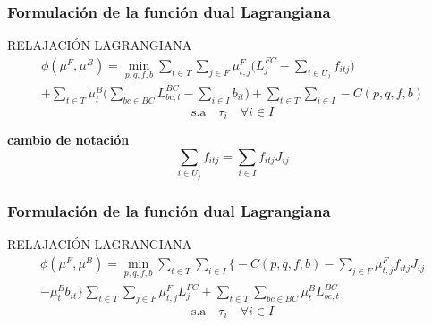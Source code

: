 \documentclass[xcolor=dvipsnames, utf8, spanish]{beamer} %
\begin{document}
\begin{frame}
	\frametitle{Formulación de la función dual Lagrangiana}
	\begingroup
		\begin{block} {RELAJACIÓN LAGRANGIANA}
			\begin{align}
				\phi(\mu^F,\mu^B)=\min_{p,q,f,b} \sum_{t \in T} \sum_{j \in F} \mu_{t,j}^F \Big( L_j^{FC}-\sum_{i \in U_j}f_{itj} \Big)   \nonumber \\	
				+ \sum_{t \in T} \mu_{t}^B \Big( \sum_{bc \in BC} L_{bc,t}^{BC}-\sum_{i \in I} b_{it} \Big) +\sum_{t \in T} \sum_{i \in I}-C(p,q,f,b) 
			\end{align}
			\begin{displaymath}
				\text{s.a} \quad \tau_i \quad \forall i \in I
			\end{displaymath}
		\end{block}
	\endgroup
	\textbf{cambio de notación}
	\begin{displaymath}
		\sum_{i \in U_j}f_{itj} =   \sum_{i \in I}f_{itj}J_{ij}
	\end{displaymath}
\end{frame}


\begin{frame}
	\frametitle{Formulación de la función dual Lagrangiana}
	\begingroup
		\begin{block} {RELAJACIÓN LAGRANGIANA}
			\begin{align}
			\phi(\mu^F,\mu^B)=\min_{p,q,f,b} \sum_{t \in T} \sum_{i \in I} \Big\{ -C(p,q,f,b)- \sum_{j \in F} 	\mu_{t,j}^F  f_{itj}J_{ij} \nonumber \\		
			- \mu_{t}^{B} b_{it} \Big\} \sum_{t \in T} \sum_{j \in F} \mu^{F}_{t,j} L^{FC}_{j}+	\sum_{t \in T} \sum_{bc \in BC} \mu^{B}_{t} L^{BC}_{bc,t}
			\end{align}
			\begin{displaymath}
				\text{s.a} \quad \tau_i \quad \forall i \in I
			\end{displaymath}
		\end{block}
	\endgroup
\end{frame}
\end{document}
